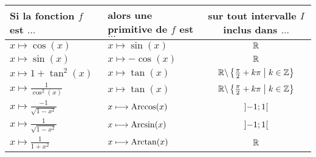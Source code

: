 \begin{defprop}
    ~\\
    \renewcommand{\arraystretch}{2.75}
	\begin{tabular}{|l|l|c|}

		\hline
		Si la fonction \(f\) est \(\dots\) & alors une primitive de \(f\) est \(\dots\) & sur tout intervalle \(I\) inclus dans \(\dots\)\\
        \hline
        \(x\mapsto \cos(x)\) & \(x\mapsto \sin(x) \) & \(\mathbb{R}\) \\
        \(x\mapsto \sin(x)\) & \(x\mapsto -\cos(x) \) & \(\mathbb{R}\) \\
        \(x\mapsto 1+\tan^2(x)\) & \(x\mapsto \tan(x) \) & \(\mathbb{R}\backslash\left\lbrace\frac{\pi}{2}+k\pi\;\middle|\; k\in\mathbb{Z}\right\rbrace\) \\
        \(x\mapsto \frac{1}{\cos^2(x)}\) & \(x\mapsto \tan(x) \) & \(\mathbb{R}\backslash\left\lbrace\frac{\pi}{2}+k\pi\;\middle|\; k\in\mathbb{Z}\right\rbrace\) \\
        \(x\mapsto \frac{-1}{\sqrt{1-x^2}}\) & \(x\longmapsto \operatorname{Arccos}(x) \) & \(\left]-1;1\right[\) \\
        \(x\mapsto \frac{1}{\sqrt{1-x^2}}\) & \(x\longmapsto \operatorname{Arcsin}(x) \) & \(\left]-1;1\right[\) \\
        \(x\mapsto \frac{1}{1+x^2}\) & \(x\longmapsto \operatorname{Arctan}(x) \) & \(\mathbb{R}\) \\

        \hline
	\end{tabular}
\end{defprop}

